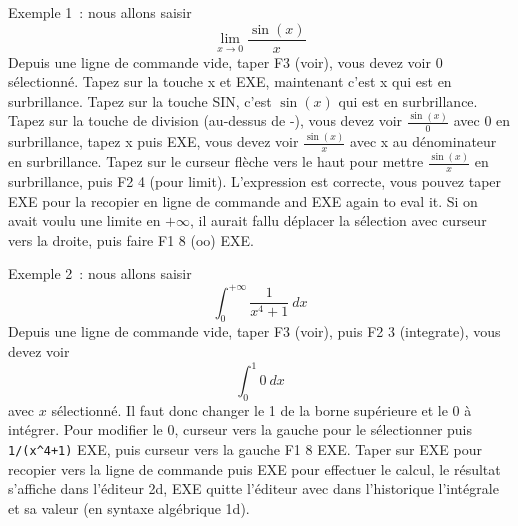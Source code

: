 \documentclass{article}
\begin{document}
\begin{giacjshere}
Exemple 1~: nous allons saisir 
$$ \lim_{x \rightarrow 0} \frac{\sin(x)}{x}$$
Depuis une ligne de commande vide, taper F3 (voir), vous devez voir 0 
s\'electionn\'e. Tapez sur la touche x et EXE, maintenant c'est x qui
est en surbrillance. Tapez sur la touche SIN, c'est $\sin(x)$ qui
est en surbrillance. Tapez sur la touche de division (au-dessus de -), 
vous devez voir $\frac{\sin(x)}{0}$ avec 0 en surbrillance, tapez
x puis EXE, vous devez voir $\frac{\sin(x)}{x}$ avec
x au d\'enominateur en surbrillance. Tapez sur le curseur
fl\`eche vers le haut pour mettre $\frac{\sin(x)}{x}$ en surbrillance,
puis F2 4 (pour limit). L'expression est correcte, vous pouvez taper EXE
pour la recopier en ligne de commande and EXE again to eval it. 
Si on avait voulu
une limite en $+\infty$, il aurait fallu d\'eplacer la s\'election
avec curseur vers la droite, puis faire F1 8 (oo) EXE.

Exemple 2~: nous allons saisir
$$ \int_0^{+\infty} \frac{1}{x^4+1} \ dx $$
Depuis une ligne de commande vide, taper F3 (voir), puis F2 3 (integrate),
vous devez voir
$$ \int_0^1 0 \ dx$$
avec $x$ s\'electionn\'e. Il faut donc changer le 1 de la borne sup\'erieure
et le 0 \`a int\'egrer. Pour modifier le 0, curseur vers la gauche pour
le s\'electionner puis \verb|1/(x^4+1)| EXE, puis curseur vers
la gauche F1 8 EXE. Taper sur EXE pour recopier vers la ligne
de commande puis EXE pour effectuer le calcul, le r\'esultat s'affiche
dans l'\'editeur 2d, EXE quitte l'\'editeur avec dans l'historique
l'int\'egrale et sa valeur (en syntaxe alg\'ebrique 1d).


\end{giacjshere}
\end{document}
